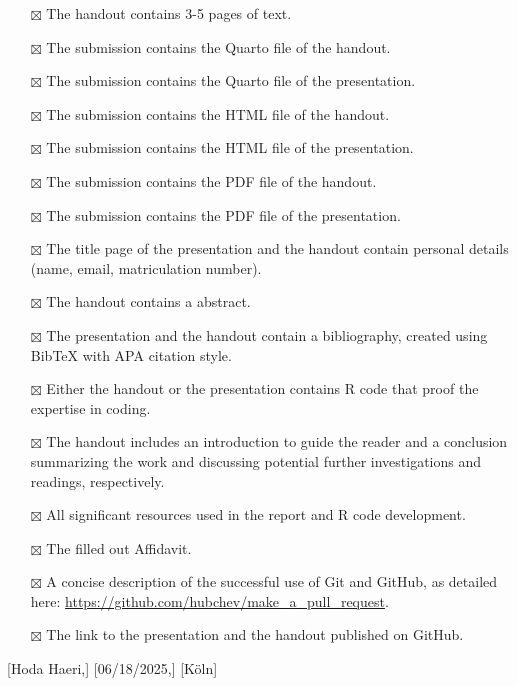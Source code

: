 \documentclass[
  man,
  floatsintext,
  longtable,
  nolmodern,
  notxfonts,
  notimes,
  colorlinks=true,linkcolor=blue,citecolor=blue,urlcolor=blue]{apa7}
\providecommand{\tightlist}{%
  \setlength{\itemsep}{0pt}\setlength{\parskip}{0pt}}
\begin{document}
\begin{itemize}
\tightlist
\item[$\boxtimes$]
  The handout contains 3-5 pages of text.
\item[$\boxtimes$]
  The submission contains the Quarto file of the handout.
\item[$\boxtimes$]
  The submission contains the Quarto file of the presentation.
\item[$\boxtimes$]
  The submission contains the HTML file of the handout.
\item[$\boxtimes$]
  The submission contains the HTML file of the presentation.
\item[$\boxtimes$]
  The submission contains the PDF file of the handout.
\item[$\boxtimes$]
  The submission contains the PDF file of the presentation.
\item[$\boxtimes$]
  The title page of the presentation and the handout contain personal
  details (name, email, matriculation number).
\item[$\boxtimes$]
  The handout contains a abstract.
\item[$\boxtimes$]
  The presentation and the handout contain a bibliography, created using
  BibTeX with APA citation style.
\item[$\boxtimes$]
  Either the handout or the presentation contains R code that proof the
  expertise in coding.
\item[$\boxtimes$]
  The handout includes an introduction to guide the reader and a
  conclusion summarizing the work and discussing potential further
  investigations and readings, respectively.
\item[$\boxtimes$]
  All significant resources used in the report and R code development.
\item[$\boxtimes$]
  The filled out Affidavit.
\item[$\boxtimes$]
  A concise description of the successful use of Git and GitHub, as
  detailed here: \url{https://github.com/hubchev/make_a_pull_request}.
\item[$\boxtimes$]
  The link to the presentation and the handout published on GitHub.
\end{itemize}

{[}Hoda Haeri,{]} {[}06/18/2025,{]} {[}Köln{]}
\end{document}
